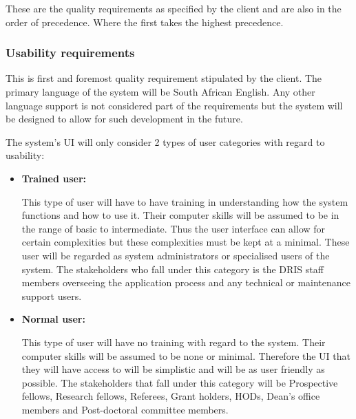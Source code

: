 These are the quality requirements as specified by the client and are also in the order of precedence. Where the first takes the highest precedence.

\subsubsection{Usability requirements}

\begin{flushleft}

This is first and foremost quality requirement stipulated by the client. The primary language of the system will be South African English. Any other language support is not considered part of the requirements but the system will be designed to allow for such development in the future.\\

\vspace{0.1in}

The system's UI will only consider 2 types of user categories with regard to usability:

\begin{itemize}

\item\textbf{Trained user:}

This type of user will have to have training in understanding how the system functions and how to use it. Their computer skills will be assumed to be in the range of basic to intermediate. Thus the user interface can allow for certain complexities but these complexities must be kept at a minimal. These user will be regarded as system administrators or specialised users of the system. The stakeholders who fall under this category is the DRIS staff members overseeing the application process and any technical or maintenance support users.

\item\textbf{Normal user:}

This type of user will have no training with regard to the system. Their computer skills will be assumed to be none or minimal. Therefore the UI that they will have access to will be simplistic and will be as user friendly as possible. The stakeholders that fall under this category will be Prospective fellows, Research fellows, Referees, Grant holders, HODs, Dean's office members and Post-doctoral committee members.

\end{itemize}


\end{flushleft}
